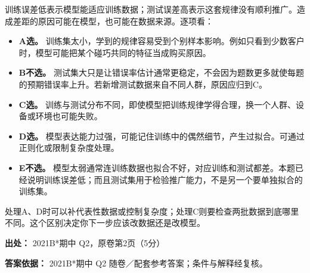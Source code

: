 训练误差低表示模型能适应训练数据；测试误差高表示这套规律没有顺利推广。造成差距的原因可能在模型，也可能在数据来源。逐项看：



\begin{itemize}

\item \textbf{A选。} 训练集太小，学到的规律容易受到个别样本影响。例如只看到少数客户时，模型可能把某个碰巧共同的特征当成购买原因。

\item \textbf{B不选。} 测试集大只是让错误率估计通常更稳定，不会因为题数更多就使每题的预期错误率上升。若新增测试数据来自不同人群，原因应归到C。

\item \textbf{C选。} 训练与测试分布不同，即使模型把训练规律学得合理，换一个人群、设备或环境也可能失败。

\item \textbf{D选。} 模型表达能力过强，可能记住训练中的偶然细节，产生过拟合。可通过正则化或限制复杂度处理。

\item \textbf{E不选。} 模型太弱通常连训练数据也拟合不好，对应训练和测试都差。本题已经说明训练误差低；而且测试集用于检验推广能力，不是另一个要单独拟合的训练集。

\end{itemize}


处理A、D时可以补代表性数据或控制复杂度；处理C则要检查两批数据到底哪里不同。这个区别决定你下一步应该改数据还是改模型。


\textbf{出处：} 2021B*期中 Q2，原卷第2页（5分）


\textbf{答案依据：} 2021B*期中 Q2 随卷／配套参考答案；条件与解释经复核。
